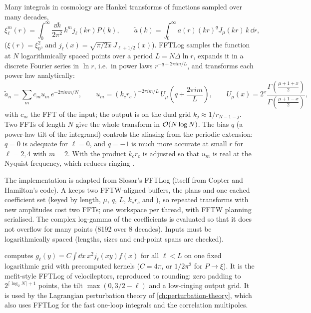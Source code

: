 Many integrals in cosmology are Hankel transforms of functions sampled over many decades,
\begin{equation}
\xi_\ell^m(r)=\int_0^\infty\frac{\dd k}{2\pi^2}\,k^mj_\ell(kr)P(k),\qquad
\tilde a(k)=\int_0^\infty a(r)(kr)^qJ_\mu(kr)\,k\,\dd r,
\end{equation}
($\xi(r)=\xi_0^2$, and $j_\ell(x)=\sqrt{\pi/2x}\,J_{\ell+1/2}(x)$). FFTLog \cite{Talman1978,Hamilton2000} samples the
function at $N$ logarithmically spaced points over a period $L=N\Delta\ln r$, expands it in a discrete Fourier series in
$\ln r$, i.e.\ in power laws $r^{-q+2\pi im/L}$, and transforms each power law analytically:
\begin{equation}
\tilde a_n=\sum_m c_m u_m\,e^{-2\pi imn/N},\qquad
u_m=(k_cr_c)^{-2\pi im/L}\,U_\mu\!\left(q+\frac{2\pi im}{L}\right),\qquad
U_\mu(x)=2^x\frac{\Gamma\!\left(\frac{\mu+1+x}{2}\right)}{\Gamma\!\left(\frac{\mu+1-x}{2}\right)},
\end{equation}
with $c_m$ the FFT of the input; the output is on the dual grid $k_j\approx1/r_{N-1-j}$. Two FFTs of length $N$ give the whole
transform in $\mathcal{O}(N\log N)$. The bias $q$ (a power-law tilt of the integrand) controls the aliasing from the periodic
extension: $q=0$ is adequate for $\ell=0$, and $q=-1$ is much more accurate at small $r$ for $\ell=2,4$ with $m=2$. With
 the product $k_cr_c$ is adjusted so that $u_m$ is real at the Nyquist frequency, which reduces ringing
\cite{Hamilton2000}.

The implementation is adapted from Slosar's FFTLog (itself from Copter and Hamilton's code). A  keeps two
FFTW-aligned buffers, the plans and one cached coefficient set (keyed by length, $\mu$, $q$, $L$, $k_cr_c$ and ),
so repeated transforms with new amplitudes cost two FFTs; one workspace per thread, with FFTW planning serialised. The complex
log-gamma of the coefficients is evaluated so that it does not overflow for many points (8192 over 8 decades). Inputs must be
logarithmically spaced (lengths, sizes and end-point spans are checked).

 computes $g_\ell(y)=C\int\dd x\,x^2j_\ell(xy)f(x)$ for all $\ell<L$ on one fixed logarithmic grid
with precomputed kernels ($C=4\pi$, or $1/2\pi^2$ for $P\to\xi$). It is the mcfit-style FFTLog of velocileptors, reproduced to
rounding: zero padding to $2^{\lceil\log_2N\rceil+1}$ points, the tilt $\max(0,3/2-\ell)$ and a low-ringing output grid.
It is used by the Lagrangian perturbation theory of \cref{ch:perturbation-theory}, which also uses FFTLog for the fast one-loop
integrals and the correlation multipoles.

